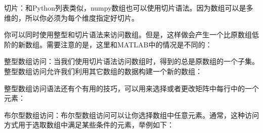 \begin{frame}

切片：和Python列表类似，numpy数组也可以使用切片语法。因为数组可以是多维的，所以你必须为每个维度指定好切片。




\end{frame}

\begin{frame}


你可以同时使用整型和切片语法来访问数组。但是，这样做会产生一个比原数组低阶的新数组。需要注意的是，这里和MATLAB中的情况是不同的：




\end{frame}

\begin{frame}


整型数组访问：当我们使用切片语法访问数组时，得到的总是原数组的一个子集。整型数组访问允许我们利用其它数组的数据构建一个新的数组：



\end{frame}

\begin{frame}


整型数组访问语法还有个有用的技巧，可以用来选择或者更改矩阵中每行中的一个元素：


\end{frame}

\begin{frame}


布尔型数组访问：布尔型数组访问可以让你选择数组中任意元素。通常，这种访问方式用于选取数组中满足某些条件的元素，举例如下：


\end{frame}

